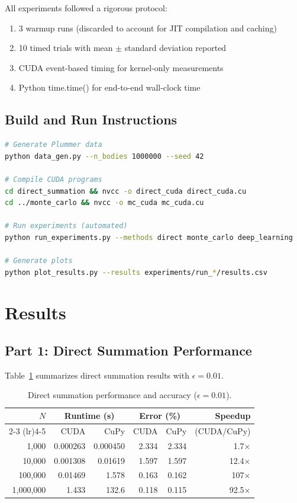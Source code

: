 \documentclass[11pt,a4paper]{article}
\begin{document}
All experiments followed a rigorous protocol:
\begin{enumerate}
\item 3 warmup runs (discarded to account for JIT compilation and caching)
\item 10 timed trials with mean $\pm$ standard deviation reported
\item CUDA event-based timing for kernel-only measurements
\item Python time.time() for end-to-end wall-clock time
\end{enumerate}

\subsection{Build and Run Instructions}

\begin{lstlisting}[language=bash, caption={Compilation and execution commands}, label={lst:build_run}]
# Generate Plummer data
python data_gen.py --n_bodies 1000000 --seed 42

# Compile CUDA programs
cd direct_summation && nvcc -o direct_cuda direct_cuda.cu
cd ../monte_carlo && nvcc -o mc_cuda mc_cuda.cu

# Run experiments (automated)
python run_experiments.py --methods direct monte_carlo deep_learning

# Generate plots
python plot_results.py --results experiments/run_*/results.csv
\end{lstlisting}

\section{Results}

\subsection{Part 1: Direct Summation Performance}

Table~\ref{table:direct_results} summarizes direct summation results with $\epsilon=0.01$.

\begin{table}[H]
  \centering
  \caption{Direct summation performance and accuracy ($\epsilon=0.01$).}
  \label{table:direct_results}
  \begin{tabular}{rrrrrr}
    \toprule
    $N$ & \multicolumn{2}{c}{Runtime (s)} & \multicolumn{2}{c}{Error (\%)} & Speedup \\
    \cmidrule(lr){2-3} \cmidrule(lr){4-5}
    & CUDA & CuPy & CUDA & CuPy & (CUDA/CuPy) \\
    \midrule
    1,000 & 0.000263 & 0.000450 & 2.334 & 2.334 & 1.7× \\
    10,000 & 0.001308 & 0.01619 & 1.597 & 1.597 & 12.4× \\
    100,000 & 0.01469 & 1.578 & 0.163 & 0.162 & 107× \\
    1,000,000 & 1.433 & 132.6 & 0.118 & 0.115 & 92.5× \\
    \bottomrule
  \end{tabular}
\end{table}
\end{document}
